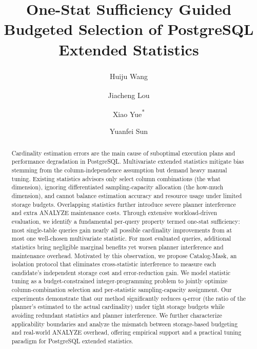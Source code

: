 \documentclass[sigconf, nonacm]{acmart}
\begin{document}
\title{One-Stat Sufficiency Guided Budgeted Selection of PostgreSQL Extended Statistics}

\author{Huiju Wang\textsuperscript{\textdagger}}

\author{Jiacheng Lou\textsuperscript{\textdagger}}

\author{Xiao Yue\textsuperscript{*}}

\author{Yuanfei Sun}

\begin{abstract}
Cardinality estimation errors are the main cause of suboptimal execution
plans and performance degradation in PostgreSQL. Multivariate extended
statistics mitigate bias stemming from the column-independence assumption but
demand heavy manual tuning. Existing statistics advisors only select column
combinations (the what dimension), ignoring differentiated sampling-capacity
allocation (the how-much dimension), and cannot balance estimation accuracy
and resource usage under limited storage budgets. Overlapping statistics
further introduce severe planner interference and extra ANALYZE maintenance
costs.
Through extensive workload-driven evaluation, we identify a fundamental
per-query property termed one-stat sufficiency: most single-table queries gain
nearly all possible cardinality improvements from at most one well-chosen
multivariate statistic. For most evaluated queries, additional statistics bring
negligible marginal benefits yet worsen planner interference and maintenance
overhead.
Motivated by this observation, we propose Catalog-Mask, an isolation protocol
that eliminates cross-statistic interference to measure each candidate's
independent storage cost and error-reduction gain. We model statistic tuning as
a budget-constrained integer-programming problem to jointly optimize
column-combination selection and per-statistic sampling-capacity assignment.
Our experiments demonstrate that our method significantly reduces q-error
(the ratio of the planner's estimated to the actual cardinality)
under tight storage budgets while avoiding redundant statistics and planner
interference. We further characterize applicability boundaries and analyze the
mismatch between storage-based budgeting and real-world ANALYZE overhead,
offering empirical support and a practical tuning paradigm for PostgreSQL
extended statistics.
\end{abstract}
\end{document}
